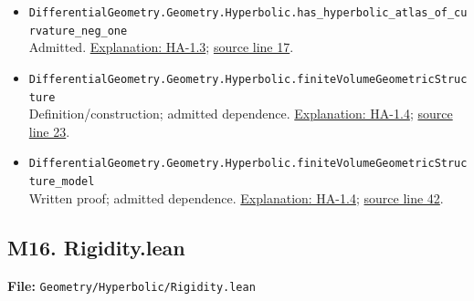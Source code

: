 \documentclass[
  letterpaper,
  11pt]{article}
\begin{document}
\begin{itemize}
\item
  {\small\texttt{Differential\allowbreak{}Geometry.\allowbreak{}Geometry.\allowbreak{}Hyperbolic.\allowbreak{}has\_\allowbreak{}hyperbolic\_\allowbreak{}atlas\_\allowbreak{}of\_\allowbreak{}curvature\_\allowbreak{}neg\_\allowbreak{}one}}\\
  Admitted. \hyperref[ha-1-3]{Explanation: HA-1.3};
  \href{https://github.com/qinz1yang/differential-geometry-dev/blob/ea0fae60ee01ef8c8d9b57a51794c6538f679c5d/DifferentialGeometry/Geometry/Hyperbolic/ModelAtlas.lean\#L17}{source
  line 17}.
\item
  {\small\texttt{Differential\allowbreak{}Geometry.\allowbreak{}Geometry.\allowbreak{}Hyperbolic.\allowbreak{}finite\allowbreak{}Volume\allowbreak{}Geometric\allowbreak{}Structure}}\\
  Definition/construction; admitted dependence.
  \hyperref[ha-1-4]{Explanation: HA-1.4};
  \href{https://github.com/qinz1yang/differential-geometry-dev/blob/ea0fae60ee01ef8c8d9b57a51794c6538f679c5d/DifferentialGeometry/Geometry/Hyperbolic/ModelAtlas.lean\#L23}{source
  line 23}.
\item
  {\small\texttt{Differential\allowbreak{}Geometry.\allowbreak{}Geometry.\allowbreak{}Hyperbolic.\allowbreak{}finite\allowbreak{}Volume\allowbreak{}Geometric\allowbreak{}Structure\_\allowbreak{}model}}\\
  Written proof; admitted dependence. \hyperref[ha-1-4]{Explanation:
  HA-1.4};
  \href{https://github.com/qinz1yang/differential-geometry-dev/blob/ea0fae60ee01ef8c8d9b57a51794c6538f679c5d/DifferentialGeometry/Geometry/Hyperbolic/ModelAtlas.lean\#L42}{source
  line 42}.
\end{itemize}


\subsection{M16. Rigidity.lean}\label{m16.-rigidity.lean}

\textbf{File:}
{\small\texttt{Geometry/\allowbreak{}Hyperbolic/\allowbreak{}Rigidity.\allowbreak{}lean}}
\end{document}
